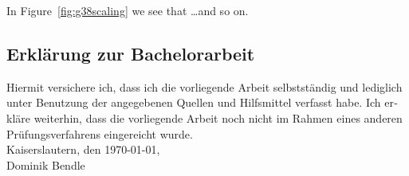 \documentclass[
  paper=a4,
  titlepage,
  bibliography=totoc,
  pagesize=pdftex
]{scrartcl}
\numberwithin{figure}{section}
\numberwithin{equation}{section}
\numberwithin{table}{section}
\theoremstyle{definition}
\numberwithin{definition}{section}
\begin{document}
In Figure~\ref{fig:g38scaling} we see that \dots and so on.

\clearpage

\printbibliography

\begin{otherlanguage}{ngerman}
  \section*{Erklärung zur Bachelorarbeit}
  Hiermit versichere ich, dass ich die vorliegende Arbeit selbstständig und lediglich
  unter Benutzung der angegebenen Quellen und Hilfsmittel verfasst habe. Ich erkläre
  weiterhin, dass die vorliegende Arbeit noch nicht im Rahmen eines anderen
  Prüfungsverfahrens eingereicht wurde.\\[1em]
  Kaiserslautern, den \today,\\[5em]
  Dominik Bendle
  \thispagestyle{plain}
\end{otherlanguage}
\end{document}
